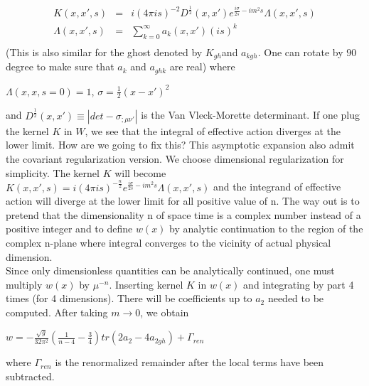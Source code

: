 \documentclass[a4paper,12 pt]{article}
\begin{document}
\begin{eqnarray*}
K(x,x',s) & = & i(4 \pi i
s)^{-2}D^{\frac{1}{2}}(x,x')e^{\frac{i\sigma}{2s}-im^{2}s}\Lambda(x,x',s)\\
  \Lambda(x,x',s) & = & \sum_{k=0}^{\infty}a_{k}(x,x')(is)^{k}\\
\end{eqnarray*}
(This is also similar for the ghost denoted by $K_{gh}$and $a_{k
gh}$. One can rotate by $ 90 $ degree to make sure that $a_{k}$
and $a_{gh k}$ are real) where
\begin{center}
  $ \Lambda(x,x,s=0) = 1$, $\sigma = \frac{1}{2}(x-x')^{2}$
\end{center}
and $ D^{\frac{1}{2}}(x,x')\equiv|det -\sigma_{;\mu\nu'}| $ is the
Van Vleck-Morette determinant. If one plug the kernel $K$ in $W$,
we see that the integral of effective action diverges at the lower
limit. How are we going to fix this? This asymptotic expansion
also admit the covariant regularization version. We choose
dimensional regularization for simplicity. The kernel $ K $ will
become $ K(x,x',s) = i(4 \pi i
s)^{-\frac{n}{2}}e^{\frac{i\sigma}{2s}-im^{2}s}\Lambda(x,x',s) $
and the integrand of effective action will diverge at the lower
limit for all positive value of n. The way out is to pretend that
the dimensionality n of space time is a complex number instead of
a positive integer and to define $w(x)$ by analytic continuation
to the region of the complex n-plane where integral converges to
the vicinity of actual physical dimension.
\\ Since only dimensionless quantities can be analytically
continued, one must multiply $ w(x) $ by $\mu^{-n}$. Inserting
kernel $K$ in $w(x)$ and integrating by part 4 times (for 4
dimensions). There will be coefficients up to $a_{2}$ needed to be
computed. After taking $m \rightarrow 0$, we obtain
\begin{center}
$ w = - \frac{\sqrt{g}}{32 \pi^{2}}(\frac{1}{n-4}-\frac{3}{4})tr(2
a_{2}-4 a_{2 gh}) + \Gamma_{ren}$
\end{center}
where $\Gamma_{ren}$ is the renormalized remainder after the local
terms have been subtracted.
\end{document}
